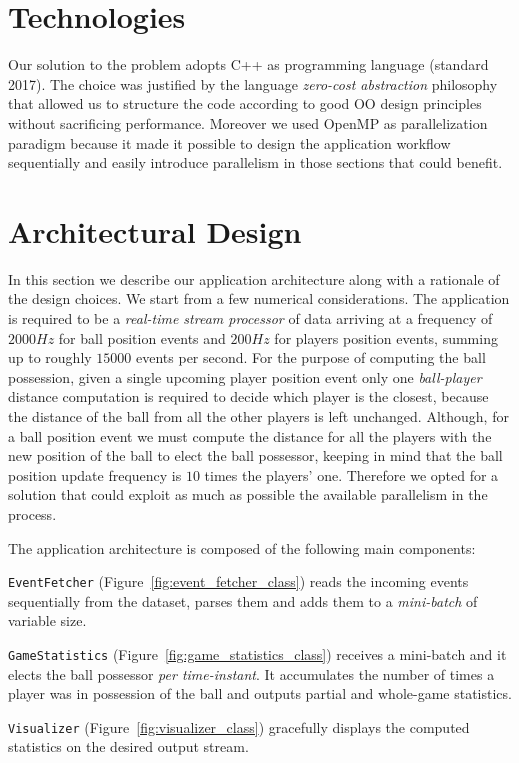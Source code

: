 \documentclass[a4paper, 11pt]{article}
\begin{document}
\begin{multicols}{2}
\section{Technologies}
Our solution to the problem adopts C++ as programming language (standard 2017). The choice was justified by the language \emph{zero-cost abstraction} philosophy that allowed us to structure the code according to good OO design principles without sacrificing performance. Moreover we used OpenMP \cite{omp} as parallelization paradigm because it made it possible to design the application workflow sequentially and easily introduce parallelism in those sections that could benefit.

\section{Architectural Design}
In this section we describe our application architecture along with a rationale of the design choices. We start from a few numerical considerations. The application is required to be a \textit{real-time stream processor} of data arriving at a frequency of $2000Hz$ for ball position events and $200Hz$ for players position events, summing up to roughly $15000$ events per second. For the purpose of computing the ball possession, given a single upcoming player position event only one \textit{ball-player} distance computation is required to decide which player is the closest, because the distance of the ball from all the other players is left unchanged. Although, for a ball position event we must compute the distance for all the players with the new position of the ball to elect the ball possessor, keeping in mind that the ball position update frequency is $10$ times the players' one. Therefore we opted for a solution that could exploit as much as possible the available parallelism in the process.

The application architecture is composed of the following main components:
\begin{enumerate*}[(a)]
    \item \texttt{EventFetcher} (Figure~\ref{fig:event_fetcher_class}) reads the incoming events sequentially from the dataset, parses them and adds them to a \textit{mini-batch} of variable size.
    \item \texttt{GameStatistics} (Figure~\ref{fig:game_statistics_class}) receives a mini-batch and it elects the ball possessor \emph{per time-instant}. It accumulates the number of times a player was in possession of the ball and outputs partial and whole-game statistics.
    \item \texttt{Visualizer} (Figure~\ref{fig:visualizer_class}) gracefully displays the computed statistics on the desired output stream.
\end{enumerate*}


\end{multicols}
\end{document}
